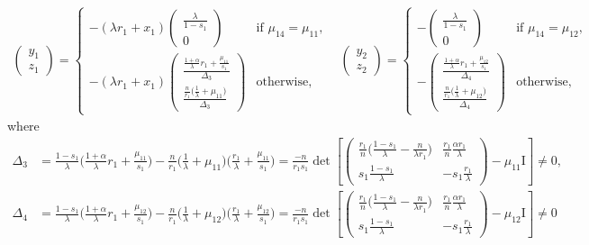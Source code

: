 \documentclass[a4paper,11pt]{article}
\begin{document}
\begin{equation} \label{eq:S1-1}
\begin{aligned}
\begin{pmatrix}
 y_1\\z_1
\end{pmatrix}
=\begin{cases}
  -(\lambda r_1 + x_1)\begin{pmatrix}
  \frac{\lambda}{1-s_1}\\0
  \end{pmatrix} & \text{if $\mu_{14}=\mu_{11}$,}\\
  -(\lambda r_1 + x_1)
  \begin{pmatrix}
  \frac{ \frac{1+\alpha}{\lambda}r_1 + \frac{\mu_{11}}{s_1} }{ \Delta_3 }\\
  \frac{ \frac{n}{r_1}\big(\frac{1}{\lambda} + \mu_{11}\big) }{ \Delta_3 }
  \end{pmatrix} & \text{otherwise,}
 \end{cases}
 \quad
 \begin{pmatrix}
 y_2\\z_2
\end{pmatrix}
=\begin{cases}
 -\begin{pmatrix}
  \frac{\lambda}{1-s_1}\\0
  \end{pmatrix} & \text{if $\mu_{14}=\mu_{12}$,}\\
  -\begin{pmatrix}
  \frac{ \frac{1+\alpha}{\lambda}r_1 + \frac{\mu_{12}}{s_1} }{ \Delta_4 }\\
  \frac{ \frac{n}{r_1}\big(\frac{1}{\lambda} + \mu_{12}\big) }{ \Delta_4 }
  \end{pmatrix} & \text{otherwise,}
 \end{cases}
\end{aligned}
\end{equation}
where 
\begin{align*}
 \Delta_3 &= \frac{1-s_1}{\lambda}\big(\frac{1+\alpha}{\lambda}r_1 + \frac{\mu_{11}}{s_1}\big) -\frac{n}{r_1} \big( \frac{1}{\lambda} + \mu_{11}\big)\big(\frac{r_1}{\lambda} + \frac{\mu_{11}}{s_1}\big)=\frac{-n}{r_1s_1}\det \left[\begin{pmatrix} \frac{r_1}{n}\big(\frac{1-s_1}{\lambda}-\frac{n}{\lambda r_1}\big) & \frac{r_1}{n}\frac{\alpha r_1}{\lambda}\\ s_1\frac{1-s_1}{\lambda} & -s_1\frac{r_1}{\lambda} \end{pmatrix} -\mu_{11}\textrm{I}\right]\ne0,\\
 \Delta_4 &= \frac{1-s_1}{\lambda}\big(\frac{1+\alpha}{\lambda}r_1 + \frac{\mu_{12}}{s_1}\big) -\frac{n}{r_1} \big( \frac{1}{\lambda} + \mu_{12}\big)\big(\frac{r_1}{\lambda} + \frac{\mu_{12}}{s_1}\big)=\frac{-n}{r_1s_1}\det \left[\begin{pmatrix} \frac{r_1}{n}\big(\frac{1-s_1}{\lambda}-\frac{n}{\lambda r_1}\big) & \frac{r_1}{n}\frac{\alpha r_1}{\lambda}\\ s_1\frac{1-s_1}{\lambda} & -s_1\frac{r_1}{\lambda} \end{pmatrix} -\mu_{12}\textrm{I}\right]\ne0
\end{align*}
\end{document}
